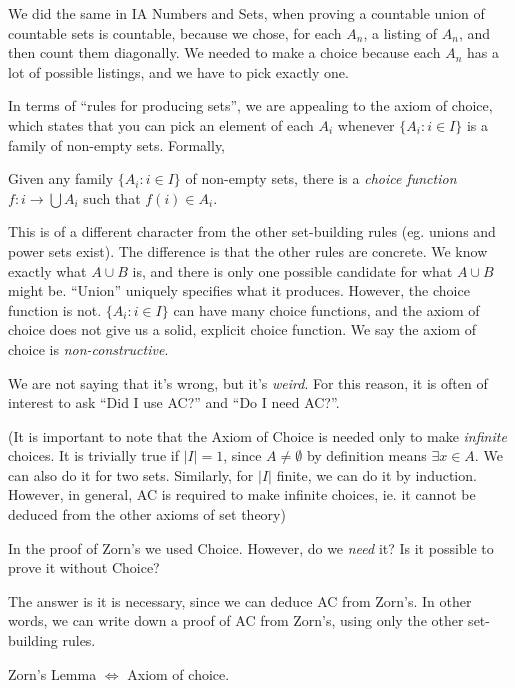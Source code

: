 \documentclass[a4paper]{article}
\begin{document}
We did the same in IA Numbers and Sets, when proving a countable union of countable sets is countable, because we chose, for each $A_n$, a listing of $A_n$, and then count them diagonally. We needed to make a choice because each $A_n$ has a lot of possible listings, and we have to pick exactly one.

In terms of ``rules for producing sets'', we are appealing to the axiom of choice, which states that you can pick an element of each $A_i$ whenever $\{A_i: i\in I\}$ is a family of non-empty sets. Formally,
\begin{axiom}
  Given any family $\{A_i: i\in I\}$ of non-empty sets, there is a \emph{choice function} $f: i \to \bigcup A_i$ such that $f(i)\in A_i$.
\end{axiom}
This is of a different character from the other set-building rules (eg. unions and power sets exist). The difference is that the other rules are concrete. We know exactly what $A\cup B$ is, and there is only one possible candidate for what $A\cup B$ might be. ``Union'' uniquely specifies what it produces. However, the choice function is not. $\{A_i:i\in I\}$ can have many choice functions, and the axiom of choice does not give us a solid, explicit choice function. We say the axiom of choice is \emph{non-constructive}.

We are not saying that it's wrong, but it's \emph{weird}. For this reason, it is often of interest to ask ``Did I use AC?'' and ``Do I need AC?''.

(It is important to note that the Axiom of Choice is needed only to make \emph{infinite} choices. It is trivially true if $|I| = 1$, since $A\not=\emptyset$ by definition means $\exists x\in A$. We can also do it for two sets. Similarly, for $|I|$ finite, we can do it by induction. However, in general, AC is required to make infinite choices, ie. it cannot be deduced from the other axioms of set theory)

In the proof of Zorn's we used Choice. However, do we \emph{need} it? Is it possible to prove it without Choice?

The answer is it is necessary, since we can deduce AC from Zorn's. In other words, we can write down a proof of AC from Zorn's, using only the other set-building rules.

\begin{thm}
  Zorn's Lemma $\Leftrightarrow$ Axiom of choice.
\end{thm}
\end{document}
